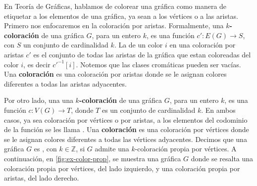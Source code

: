 En Teor\'ia de Gr\'aficas, hablamos de colorear una gr\'afica como manera de
etiquetar a los elementos de una gr\'afica, ya sean a los v\'ertices o a las
aristas. Primero nos enfocaremos en la coloraci\'on por aristas. Formalmente,
una \textbf{$k$-coloraci\'on}  de una gr\'afica $G$, para un entero $k$,
es una funci\'on $c' \colon E(G)\to S$, con $S$ un conjunto de cardinalidad $k$.
La  de un color $i$ en una coloraci\'on por aristas
$c'$ es el conjunto de todas las aristas de la gr\'afica que estan coloreadas
del color $i$, es decir $c'^{-1}[i]$. Notemos que las clases crom\'aticas pueden
ser vac\'ias. Una \textbf{coloraci\'on}  es una coloraci\'on por aristas
donde se le asignan colores diferentes a todas las aristas adyacentes.

Por otro lado, una una \textbf{$k$-coloraci\'on}
 de
una gr\'afica $G$, para un entero $k$, es una funci\'on $c \colon V(G)\to T$,
donde $T$ es un conjunto de cardinalidad $k$. En ambos casos, ya sea
coloraci\'on por v\'ertices o por aristas, a los elementos del codominio de la
funci\'on se les llama . Una \textbf{coloraci\'on}
 es una coloraci\'on por
v\'ertices donde se le asignan colores diferentes a todas las v\'ertices
adyacentes. Decimos que una gr\'afica $G$ es
, con $k \in \mathbb{Z}$, si $G$ admite una
$k$-coloraci\'on propia por v\'ertices. A continuaci\'on, en
\cref{fig:ex-color-prop}, se muestra una gr\'afica $G$ donde se resalta una
coloraci\'on propia por v\'ertices, del lado izquierdo, y una coloraci\'on
propia por aristas, del lado derecho. 

